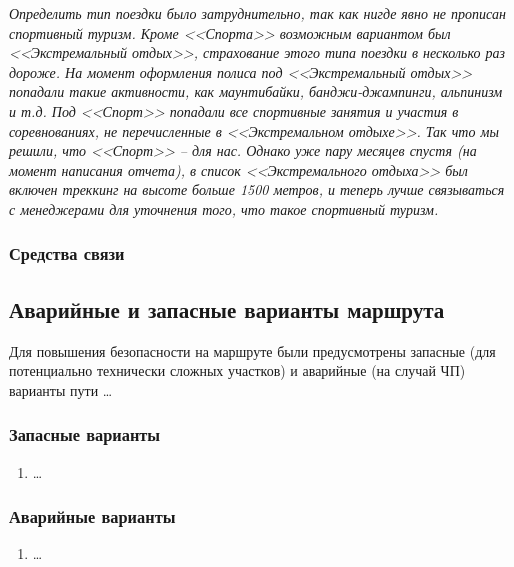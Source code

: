 			\textit{Определить тип поездки было затруднительно, так как нигде явно не прописан спортивный туризм.
			Кроме <<Спорта>> возможным вариантом был <<Экстремальный отдых>>, страхование этого типа поездки в
			несколько раз дороже. На момент оформления полиса под <<Экстремальный отдых>> попадали такие активности,
			как маунтибайки, банджи-джампинги, альпинизм и т.д. Под <<Спорт>> попадали все спортивные занятия и
			участия в соревнованиях, не перечисленные в <<Экстремальном отдыхе>>. Так что мы решили, что
			<<Спорт>> -- для нас. Однако уже пару месяцев спустя (на момент написания отчета), в список
			<<Экстремального отдыха>> был включен треккинг на высоте больше 1500 метров, и теперь лучше связываться
			с менеджерами для уточнения того, что такое спортивный туризм.}

		\subsubsection{Средства связи}
			

	\subsection{Аварийные и запасные варианты маршрута}
		Для повышения безопасности на маршруте были предусмотрены запасные (для потенциально технически сложных участков) и 
		аварийные (на случай ЧП) варианты пути \dots

		\subsubsection{Запасные варианты}
			\begin{enumerate}
				\item \dots
			\end{enumerate}


		\subsubsection{Аварийные варианты}
			\begin{enumerate}
				\item \dots
			\end{enumerate}
